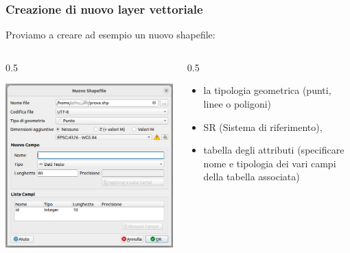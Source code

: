 \documentclass{beamer}
\begin{document}
{ \begin{frame}
   \frametitle{Creazione di nuovo layer vettoriale}
   Proviamo a creare ad esempio un nuovo shapefile:
 	\begin{columns}
		\begin{column} {0.5\textwidth}	
			 \begin{center}
			\includegraphics[width=1\textwidth] {digitizing_pics/Nuovo Layer Vettoriale 2022-10-11 09-59-20.png}
		    \end{center}
		\end{column}
 
		\begin{column} {0.5\textwidth}	
    	 \begin{itemize}
    		\item la tipologia geometrica (punti, linee o poligoni)
    		\item SR (Sistema di riferimento),
    		\item tabella degli attributi (specificare nome e tipologia dei vari campi della tabella associata)
    	\end{itemize}				
		\end{column}
		
	\end{columns}	
	   
\end{frame} 

}
\end{document}

